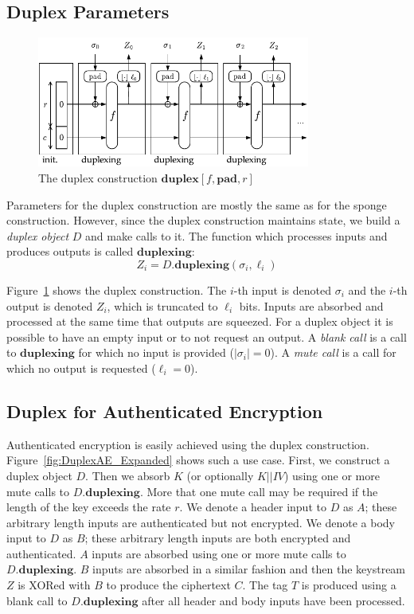 \subsection{Duplex Parameters}
\begin{figure}[ht]
\centering
\includegraphics[width=0.8\textwidth]{img/Duplex.pdf}
\caption{The duplex construction $\mathbf{duplex}[f,\mathbf{pad},r]$ \cite{Bertoni2011_SpongeFunctions}}
\label{fig:Duplex}
\end{figure}
Parameters for the duplex construction are mostly the same as for the sponge construction.
However, since the duplex construction maintains state, we build a \emph{duplex object} $D$ and make calls to it.
The function which processes inputs and produces outputs is called $\mathbf{duplexing}$:
\begin{equation*}
Z_i = D.\mathbf{duplexing}(\sigma_i,\ell_i)
\end{equation*}

Figure~\ref{fig:Duplex} shows the duplex construction.
The $i$-th input is denoted $\sigma_i$ and the $i$-th output is denoted $Z_i$, which is truncated to $\ell_i$ bits.
Inputs are absorbed and processed at the same time that outputs are squeezed.
For a duplex object it is possible to have an empty input or to not request an output.
A \emph{blank call} is a call to $\mathbf{duplexing}$ for which no input is provided ($|\sigma_i| = 0$).
A \emph{mute call} is a call for which no output is requested ($\ell_i = 0$).

\subsection{Duplex for Authenticated Encryption}
Authenticated encryption is easily achieved using the duplex construction.
Figure~\ref{fig:DuplexAE_Expanded} shows such a use case.
First, we construct a duplex object $D$.
Then we absorb $K$ (or optionally $K||IV$) using one or more mute calls to $D.\mathbf{duplexing}$.
More that one mute call may be required if the length of the key exceeds the rate $r$.
We denote a header input to $D$ as $A$; these arbitrary length inputs are authenticated but not encrypted.
We denote a body input to $D$ as $B$; these arbitrary length inputs are both encrypted and authenticated.
$A$ inputs are absorbed using one or more mute calls to $D.\mathbf{duplexing}$.
$B$ inputs are absorbed in a similar fashion and then the keystream $Z$ is XORed with $B$ to produce the ciphertext $C$.
The tag $T$ is produced using a blank call to $D.\mathbf{duplexing}$ after all header and body inputs have been processed.

